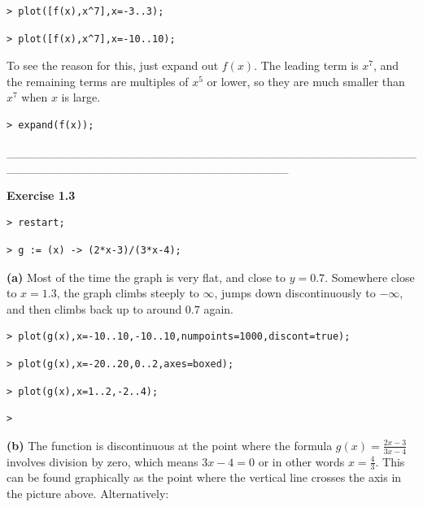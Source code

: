 \documentclass{article}
\begin{document}
\begin{lstlisting}
> plot([f(x),x^7],x=-3..3);
\end{lstlisting}
\begin{lstlisting}
> plot([f(x),x^7],x=-10..10);
\end{lstlisting}
\begin{Maple Normal}
To see the reason for this, just expand out 
$f (x)$.  The leading term is 
$x^{7}$, and the remaining terms are multiples of 
$x^{5}$ or lower, so they are much smaller than 
$x^{7}$ when 
$x$ is large.
\end{Maple Normal}
\begin{lstlisting}
> expand(f(x));
\end{lstlisting}
\begin{Maple Normal}
\_\_\_\_\_\_\_\_\_\_\_\_\_\_\_\_\_\_\_\_\_\_\_\_\_\_\_\_\_\_\_\_\_\_\_\_\_\_\_\_\_\_\_\_\_\_\_\_\_\_\_\_\_\_\_\_\_\_\_\_\_\_\_\_\_\_\_\_\_\_\_\_\_\_\_\_\_\_\_\_\_
\end{Maple Normal}
\begin{Maple Heading 2}
\textbf{Exercise 1.3}
\end{Maple Heading 2}
\begin{lstlisting}
> restart;
\end{lstlisting}
\begin{lstlisting}
> g := (x) -> (2*x-3)/(3*x-4);
\end{lstlisting}
\begin{Maple Normal}
\textbf{(a)} Most of the time the graph is very flat, and close to 
$y = 0.7$.  Somewhere close to 
$x = 1.3$, the graph climbs steeply to 
$\infty$, jumps down discontinuously to 
$-\infty$, and then climbs back up to around 
$ 0.7$ again.
\end{Maple Normal}
\begin{lstlisting}
> plot(g(x),x=-10..10,-10..10,numpoints=1000,discont=true);
\end{lstlisting}
\begin{lstlisting}
> plot(g(x),x=-20..20,0..2,axes=boxed);
\end{lstlisting}
\begin{lstlisting}
> plot(g(x),x=1..2,-2..4);
\end{lstlisting}
\begin{lstlisting}
> 
\end{lstlisting}
\begin{Maple Normal}
\textbf{(b) }The function is discontinuous at the point where the formula 
$g (x)=\frac{2 x -3}{3 x -4}$ involves division by zero, which means 
$3 x -4=0$ or in other words 
$x =\frac{4}{3}$.   This can be found graphically as the point where the vertical line crosses the axis in the picture above.  Alternatively: 
\end{Maple Normal}
\end{document}
